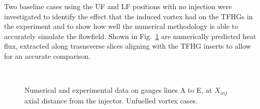 \documentclass{AIAA}
\begin{document}
Two baseline cases using the UF and LF positions with no injection were investigated to identify the effect that the induced vortex had on the TFHGs in the experiment and to show how well the numerical methodology is able to accurately simulate the flowfield.
Shown in Fig.~\ref{fig:HeatFluxVortex_Lines} are numerically predicted heat flux, extracted along trasnsverse slices aligning with the TFHG inserts to allow for an accurate comparison.


\begin{figure}[!h]
\center
%
\\
\caption{Numerical and experimental data on gauges lines A to E, at $X_{inj}$ axial distance from the injector. Unfuelled vortex cases.}
\label{fig:HeatFluxVortex_Lines}
\end{figure} 
\end{document}
